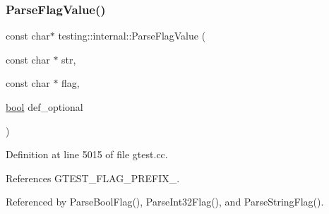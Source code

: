 \subsubsection{\texorpdfstring{Parse\+Flag\+Value()}{ParseFlagValue()}}
{\footnotesize\ttfamily const char$\ast$ testing\+::internal\+::\+Parse\+Flag\+Value (\begin{DoxyParamCaption}\item[{const char $\ast$}]{str,  }\item[{const char $\ast$}]{flag,  }\item[{\hyperlink{classbool}{bool}}]{def\+\_\+optional }\end{DoxyParamCaption})}



Definition at line 5015 of file gtest.\+cc.



References G\+T\+E\+S\+T\+\_\+\+F\+L\+A\+G\+\_\+\+P\+R\+E\+F\+I\+X\+\_\+.



Referenced by Parse\+Bool\+Flag(), Parse\+Int32\+Flag(), and Parse\+String\+Flag().



